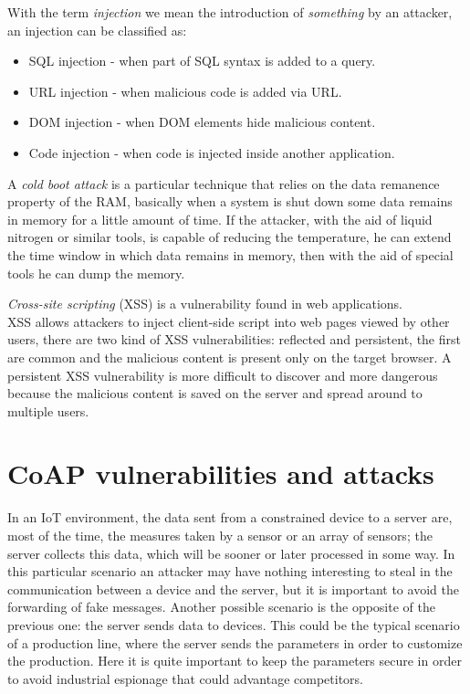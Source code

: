 	With the term \emph{injection} we mean the introduction of \emph{something} by an attacker, an injection
	can be classified as:
	\begin{itemize}
		\item SQL injection - when part of SQL syntax is added to a query.
		\item URL injection - when malicious code is added via URL.
		\item DOM injection - when DOM elements hide malicious content.
		\item Code injection - when code is injected inside another application.
	\end{itemize}
	
	A \emph{cold boot attack} is a particular technique that relies on the data remanence property of the RAM, basically when
	a system is shut down some data remains in memory for a little amount of time.
	If the attacker, with the aid of liquid nitrogen or similar tools, is capable of reducing the temperature, he can extend the time window in which data remains in memory, then with the aid of special tools he can dump the memory.\newline
	
	\emph{Cross-site scripting} (XSS) is a vulnerability found in web applications.\\
	XSS allows attackers to inject client-side script into web pages viewed by other users, there are two kind of XSS vulnerabilities:
	reflected and persistent, the first are common and the malicious content is present only on the target browser.
	A persistent XSS vulnerability is more difficult to discover and more dangerous because the malicious content is saved on the server and spread around to multiple users.\\
	
	
	\section{CoAP vulnerabilities and attacks}
	In an IoT environment, the data sent from a constrained device to a server are, most of the time, the measures taken by a sensor or an array of sensors; the server collects this data, which will be sooner or later processed in some way.\newline
	In this particular scenario an attacker may have nothing interesting to steal in the communication between a device and the server, but it is important to avoid the forwarding of fake messages.\newline
	Another possible scenario is the opposite of the previous one: the server sends data to devices. This could be the typical scenario of a production line, where the server sends the parameters in order to customize the production. Here  it is quite important to keep the parameters secure in order to avoid industrial espionage that could advantage competitors.\newline

